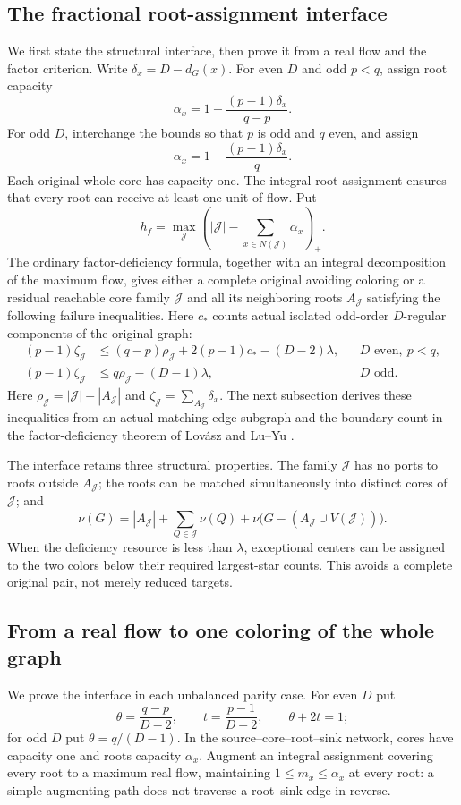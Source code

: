 \documentclass[11pt,a4paper]{article}
\theoremstyle{definition}
\begin{document}
\subsection{The fractional root-assignment interface}
We first state the structural interface, then prove it from a real flow and the factor criterion. Write $\delta_x=D-d_G(x)$. For even $D$ and odd $p<q$, assign root capacity
\[
\alpha_x=1+\frac{(p-1)\delta_x}{q-p}.
\]
For odd $D$, interchange the bounds so that $p$ is odd and $q$ even, and assign
\[
\alpha_x=1+\frac{(p-1)\delta_x}{q}.
\]
Each original whole core has capacity one. The integral root assignment ensures that every root can receive at least one unit of flow. Put
\[
h_f=\max_{\mathcal J}\left(|\mathcal J|-
\sum_{x\in N(\mathcal J)}\alpha_x\right)_+.
\]
The ordinary factor-deficiency formula, together with an integral decomposition of the maximum flow, gives either a complete original avoiding coloring or a residual reachable core family $\mathcal J$ and all its neighboring roots $A_{\mathcal J}$ satisfying the following failure inequalities. Here $c_*$ counts actual isolated odd-order $D$-regular components of the original graph:
\begin{align}
(p-1)\zeta_{\mathcal J}
&\le(q-p)\rho_{\mathcal J}+2(p-1)c_*-(D-2)\lambda,
&& D\text{ even},\ p<q,\label{eq:failure-even}\\
(p-1)\zeta_{\mathcal J}
&\le q\rho_{\mathcal J}-(D-1)\lambda,
&& D\text{ odd}.\label{eq:failure-odd}
\end{align}
Here $\rho_{\mathcal J}=|\mathcal J|-|A_{\mathcal J}|$ and
$\zeta_{\mathcal J}=\sum_{A_{\mathcal J}}\delta_x$. The next subsection derives these inequalities from an actual matching edge subgraph and the boundary count in the factor-deficiency theorem of Lovász \cite{lovasz} and Lu--Yu \cite{luyu}.

The interface retains three structural properties. The family $\mathcal J$ has no ports to roots outside $A_{\mathcal J}$; the roots can be matched simultaneously into distinct cores of $\mathcal J$; and
\begin{equation}\label{eq:packmatching}
\nu(G)=|A_{\mathcal J}|+\sum_{Q\in\mathcal J}\nu(Q)
+\nu\bigl(G-(A_{\mathcal J}\cup V(\mathcal J))\bigr).
\end{equation}
When the deficiency resource is less than $\lambda$, exceptional centers can be assigned to the two colors below their required largest-star counts. This avoids a complete original pair, not merely reduced targets.

\subsection{From a real flow to one coloring of the whole graph}
We prove the interface in each unbalanced parity case. For even $D$ put
\[
\theta=\frac{q-p}{D-2},\qquad t=\frac{p-1}{D-2},\qquad \theta+2t=1;
\]
for odd $D$ put $\theta=q/(D-1)$. In the source--core--root--sink network, cores have capacity one and roots capacity $\alpha_x$. Augment an integral assignment covering every root to a maximum real flow, maintaining $1\le m_x\le\alpha_x$ at every root: a simple augmenting path does not traverse a root--sink edge in reverse.
\end{document}
